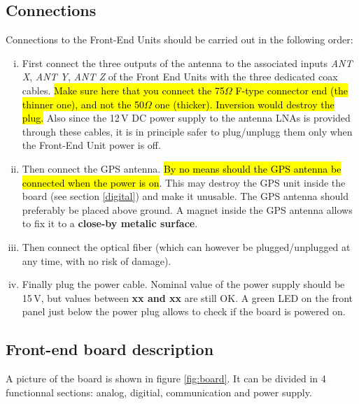 \subsection{Connections}
\label{connection}
Connections to the Front-End Units should be carried out in the following order:
\begin{enumerate}[i)]
\item {First connect the three outputs of the antenna to the associated inputs {\it ANT X}, {\it ANT Y}, {\it ANT Z} of the Front End Units with the three dedicated coax cables. \hl{Make sure here that you connect the 75$\Omega$ F-type connector end (the thinner one), and not the 50$\Omega$ one (thicker). Inversion would destroy the plug.} Also since the 12\,V DC power supply to the antenna LNAs is provided through these cables, it is in principle safer to plug/unplugg them only when the Front-End Unit power is off. }
\item {Then connect the GPS antenna. \hl{By no means should the GPS antenna be connected when the power is on}. This may destroy the GPS unit inside the board (see section \ref{digital}) and make it unusable. The GPS antenna should preferably be placed above ground. A magnet inside the GPS antenna allows to fix it to a {\bf close-by metalic surface}. }
\item {Then connect the optical fiber (which can however be plugged/unplugged at any time, with no risk of damage). }
\item {Finally plug the power cable. Nominal value of the power supply should be 15\,V, but values between {\bf xx and xx} are still OK. A green LED on the front panel just below the power plug allows to check if the board is powered on.}
\end{enumerate}

\subsection{Front-end board description}
A picture of the board is shown in figure \ref{fig:board}. It can be divided in 4 functionnal sections: analog, digitial, communication and power supply.

